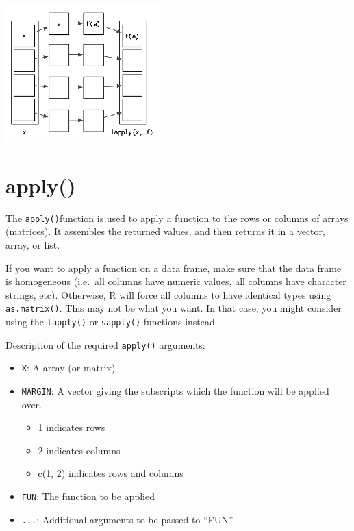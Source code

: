 \documentclass[
]{book}
\providecommand{\tightlist}{%
  \setlength{\itemsep}{0pt}\setlength{\parskip}{0pt}}
\begin{document}
\begin{center}\includegraphics[width=0.9\linewidth]{images/lapplyGraphic} \end{center}

\hypertarget{apply}{%
\section{apply()}\label{apply}}

The \texttt{apply()}function is used to apply a function to the rows or columns of arrays (matrices). It assembles the returned values, and then returns it in a vector, array, or list.

If you want to apply a function on a data frame, make sure that the data frame is homogeneous (i.e.~all columns have numeric values, all columns have character strings, etc). Otherwise, R will force all columns to have identical types using \texttt{as.matrix()}. This may not be what you want. In that case, you might consider using the \texttt{lapply()} or \texttt{sapply()} functions instead.

Description of the required \texttt{apply()} arguments:

\begin{itemize}
\tightlist
\item
  \texttt{X}: A array (or matrix)
\item
  \texttt{MARGIN}: A vector giving the subscripts which the function will be applied over.

  \begin{itemize}
  \tightlist
  \item
    1 indicates rows
  \item
    2 indicates columns
  \item
    c(1, 2) indicates rows and columns
  \end{itemize}
\item
  \texttt{FUN}: The function to be applied
\item
  \texttt{...}: Additional arguments to be passed to ``FUN''
\end{itemize}
\end{document}
